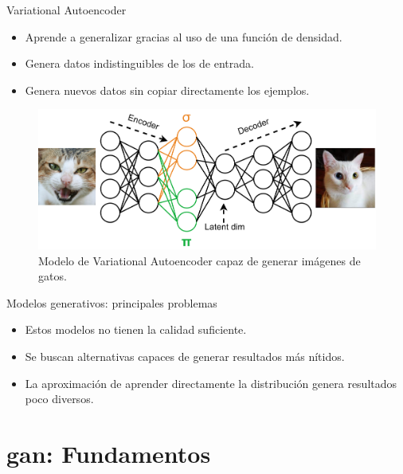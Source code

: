 \begin{frame}{Variational Autoencoder}
    
    \begin{itemize}
        \item Aprende a generalizar gracias al uso de una \alert{función de densidad}.
        
        \item Genera datos \alert{indistinguibles} de los de entrada.
        
        \item Genera nuevos datos \alert{sin copiar} directamente los ejemplos.
    \end{itemize}
    
    \begin{figure}
        \centering
        \includegraphics[width=\textwidth]{Slides/figures/GAN/Variational Autoencoder.png}
        \caption{Modelo de Variational Autoencoder capaz de generar imágenes de gatos.}
    \end{figure}
    \hfill

\end{frame}

\begin{frame}{Modelos generativos: principales problemas}
    
    \begin{itemize}
        \item Estos modelos no tienen la \alert{calidad suficiente}.
        \item Se buscan alternativas capaces de generar resultados \alert{más nítidos}.
        \item La aproximación de \alert{aprender} directamente la distribución genera resultados \alert{poco diversos}.
    \end{itemize}

\end{frame}

\section{\gls{gan}: Fundamentos}

